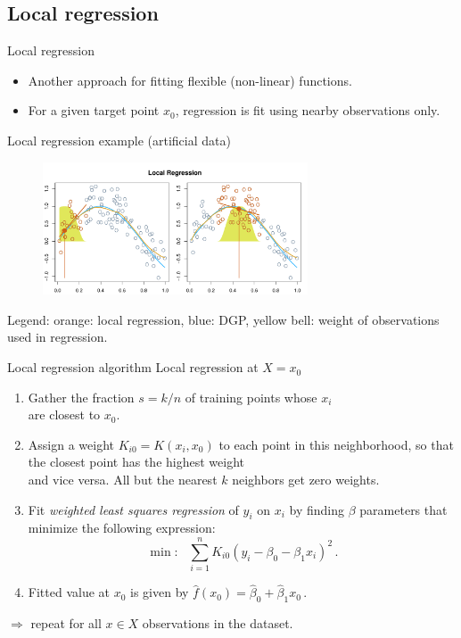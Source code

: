 \documentclass{beamer}
\begin{document}
\subsection{Local regression}
\begin{frame}{Local regression}
\begin{itemize}
    \item Another approach for fitting flexible (non-linear) functions.
    \item For a given target point $x_0$, regression is fit using nearby observations only.
\end{itemize}
\bigskip
\centering
Local regression example (artificial data)
\vspace{-0.4cm}
\begin{figure}
  \centering
  \includegraphics[trim=0cm 0cm 0cm 1.1cm, clip=true, width=0.7\textwidth]{IMG/ISLR79.pdf}
\end{figure}
\vspace{-0.4cm}
\tiny{Legend: orange: local regression, blue: DGP, yellow bell: weight of observations used in regression.}
\end{frame}
\begin{frame}{Local regression algorithm}
Local regression at $X = x_0$\\
\bigskip
\begin{enumerate}
    \item Gather the fraction $s = k/n$ of training points whose $x_i$ \\are closest to $x_0$.
    \medskip
    \item Assign a weight $K_{i0} = K(x_i , x_0)$ to each point in this neighborhood, so that the closest point has the highest weight \\and vice versa. All but the nearest $k$ neighbors get zero weights.
    \medskip
    \item Fit \textit{weighted least squares regression} of $y_i$ on $x_i$ by finding $\beta$ parameters that minimize the following expression:
    $$\min : ~~~ \sum_{i=1}^n K_{i0} (y_i - \beta_0 - \beta_1 x_i)^2 \,.$$
    \item Fitted value at $x_0$ is given by $\hat{f}(x_0) = \hat{\beta}_0 + \hat{\beta}_1 x_0\,$.
\end{enumerate}
\bigskip
$\Rightarrow$ repeat for all $x \in X$ observations in the dataset.
\end{frame}
\end{document}
